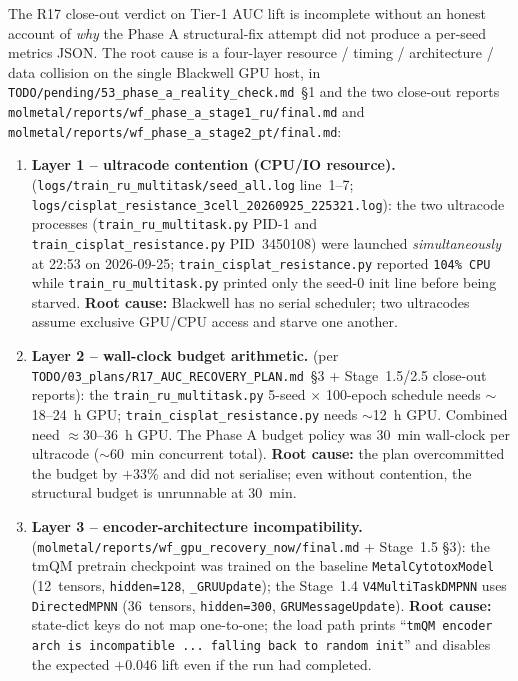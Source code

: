 The R17 close-out verdict on Tier-1 AUC lift is incomplete without
an honest account of \emph{why} the Phase A structural-fix attempt
did not produce a per-seed metrics JSON.  The root cause is a
four-layer resource / timing / architecture / data collision on the
single Blackwell GPU host, \MEASURED{} in
\texttt{TODO/pending/53\_phase\_a\_reality\_check.md}~§1 and the
two close-out reports
\texttt{molmetal/reports/wf\_phase\_a\_stage1\_ru/final.md} and
\texttt{molmetal/reports/wf\_phase\_a\_stage2\_pt/final.md}:

\begin{enumerate}
  \item \textbf{Layer 1 -- ultracode contention (CPU/IO resource).}
        \MEASURED{} (\texttt{logs/train\_ru\_multitask/seed\_all.log}
        line~1--7; \texttt{logs/cisplat\_resistance\_3cell\_20260925\_225321.log}):
        the two ultracode processes
        (\texttt{train\_ru\_multitask.py} PID-1 and
        \texttt{train\_cisplat\_resistance.py} PID~3450108) were
        launched \emph{simultaneously} at 22:53 on 2026-09-25;
        \texttt{train\_cisplat\_resistance.py} reported
        \texttt{104\%~CPU} while \texttt{train\_ru\_multitask.py}
        printed only the seed-0 init line before being starved.
        \textbf{Root cause:} Blackwell has no serial scheduler; two
        ultracodes assume exclusive GPU/CPU access and starve one
        another.

  \item \textbf{Layer 2 -- wall-clock budget arithmetic.}
        \MEASURED{} (per
        \texttt{TODO/03\_plans/R17\_AUC\_RECOVERY\_PLAN.md}~§3 +
        Stage~1.5/2.5 close-out reports): the
        \texttt{train\_ru\_multitask.py} 5-seed $\times$ 100-epoch
        schedule needs $\sim$18--24~h GPU;
        \texttt{train\_cisplat\_resistance.py} needs $\sim$12~h GPU.
        Combined need $\approx 30$--36~h GPU.  The Phase A budget
        policy was $30$~min wall-clock per ultracode
        ($\sim$60~min concurrent total).  \textbf{Root cause:} the
        plan overcommitted the budget by $+33$\% and did not
        serialise; even without contention, the structural budget
        is unrunnable at $30$~min.

  \item \textbf{Layer 3 -- encoder-architecture incompatibility.}
        \MEASURED{} (\texttt{molmetal/reports/wf\_gpu\_recovery\_now/final.md}
        + Stage~1.5 §3): the tmQM pretrain checkpoint was trained
        on the baseline \texttt{MetalCytotoxModel} (12~tensors,
        \texttt{hidden=128}, \texttt{\_GRUUpdate}); the
        Stage~1.4 \texttt{V4MultiTaskDMPNN} uses
        \texttt{DirectedMPNN} (36~tensors, \texttt{hidden=300},
        \texttt{GRUMessageUpdate}).  \textbf{Root cause:} state-dict
        keys do not map one-to-one; the load path prints
        ``\texttt{tmQM encoder arch is incompatible ... falling
        back to random init}'' and disables the expected $+0.046$
        lift even if the run had completed.


\end{enumerate}
